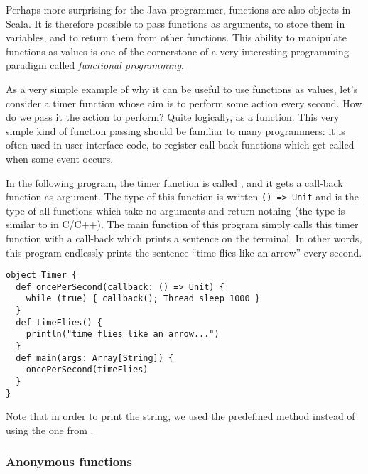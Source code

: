 \documentclass[a4paper,12pt,twoside,titlepage]{article}
\newcommand{\langname}[1]{#1\xspace}
\newcommand{\Scala}{\langname{Scala}}
\newcommand{\Java}{\langname{Java}}
\begin{document}
Perhaps more surprising for the \Java programmer, functions are also
objects in \Scala. It is therefore possible to pass functions as
arguments, to store them in variables, and to return them from other
functions. This ability to manipulate functions as values is one of
the cornerstone of a very interesting programming paradigm called
\emph{functional programming}.

As a very simple example of why it can be useful to use functions as
values, let's consider a timer function whose aim is to perform some
action every second. How do we pass it the action to perform? Quite
logically, as a function. This very simple kind of function passing
should be familiar to many programmers: it is often used in
user-interface code, to register call-back functions which get called
when some event occurs.

In the following program, the timer function is called
, and it gets a call-back function as argument.
The type of this function is written \verb|() => Unit| and is the type
of all functions which take no arguments and return nothing (the type
 is similar to  in C/C++). The main function of
this program simply calls this timer function with a call-back which
prints a sentence on the terminal. In other words, this program
endlessly prints the sentence ``time flies like an arrow'' every
second.
\begin{lstlisting}
object Timer {
  def oncePerSecond(callback: () => Unit) {
    while (true) { callback(); Thread sleep 1000 }
  }
  def timeFlies() {
    println("time flies like an arrow...")
  }
  def main(args: Array[String]) {
    oncePerSecond(timeFlies)
  }
}
\end{lstlisting}
Note that in order to print the string, we used the predefined method
 instead of using the one from .

\subsubsection{Anonymous functions}
\label{sec:anonymous-functions}
\end{document}
